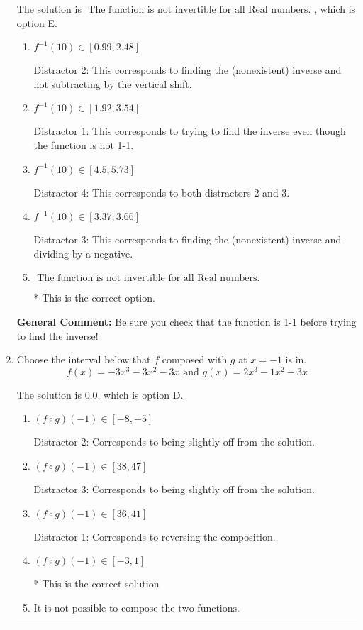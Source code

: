 \documentclass{extbook}[14pt]
\newcommand{\litem}[1]{\item #1

\rule{\textwidth}{0.4pt}}
\begin{document}
\begin{enumerate}
{The solution is \( \text{ The function is not invertible for all Real numbers. } \), which is option E.\begin{enumerate}[label=\Alph*.]
\item \( f^{-1}(10) \in [0.99, 2.48] \)

 Distractor 2: This corresponds to finding the (nonexistent) inverse and not subtracting by the vertical shift.
\item \( f^{-1}(10) \in [1.92, 3.54] \)

 Distractor 1: This corresponds to trying to find the inverse even though the function is not 1-1. 
\item \( f^{-1}(10) \in [4.5, 5.73] \)

 Distractor 4: This corresponds to both distractors 2 and 3.
\item \( f^{-1}(10) \in [3.37, 3.66] \)

 Distractor 3: This corresponds to finding the (nonexistent) inverse and dividing by a negative.
\item \( \text{ The function is not invertible for all Real numbers. } \)

* This is the correct option.
\end{enumerate}

\textbf{General Comment:} Be sure you check that the function is 1-1 before trying to find the inverse!
}
\litem{
Choose the interval below that $f$ composed with $g$ at $x=-1$ is in.
\[ f(x) = -3x^{3} -3 x^{2} -3 x \text{ and } g(x) = 2x^{3} -1 x^{2} -3 x \]

The solution is \( 0.0 \), which is option D.\begin{enumerate}[label=\Alph*.]
\item \( (f \circ g)(-1) \in [-8, -5] \)

 Distractor 2: Corresponds to being slightly off from the solution.
\item \( (f \circ g)(-1) \in [38, 47] \)

 Distractor 3: Corresponds to being slightly off from the solution.
\item \( (f \circ g)(-1) \in [36, 41] \)

 Distractor 1: Corresponds to reversing the composition.
\item \( (f \circ g)(-1) \in [-3, 1] \)

* This is the correct solution
\item \( \text{It is not possible to compose the two functions.} \)


\end{enumerate}

}
\end{enumerate}
\end{document}

